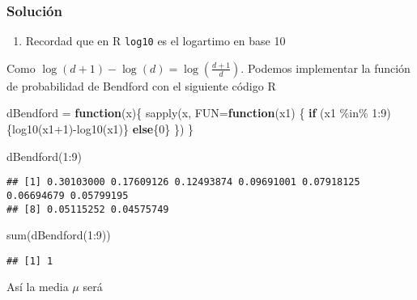 \documentclass[
]{article}
\newenvironment{Shaded}{\begin{snugshade}}{\end{snugshade}}
\newcommand{\AttributeTok}[1]{\textcolor[rgb]{0.77,0.63,0.00}{#1}}
\newcommand{\ControlFlowTok}[1]{\textcolor[rgb]{0.13,0.29,0.53}{\textbf{#1}}}
\newcommand{\DecValTok}[1]{\textcolor[rgb]{0.00,0.00,0.81}{#1}}
\newcommand{\FunctionTok}[1]{\textcolor[rgb]{0.00,0.00,0.00}{#1}}
\newcommand{\NormalTok}[1]{#1}
\newcommand{\OtherTok}[1]{\textcolor[rgb]{0.56,0.35,0.01}{#1}}
\newcommand{\SpecialCharTok}[1]{\textcolor[rgb]{0.00,0.00,0.00}{#1}}
\providecommand{\tightlist}{%
  \setlength{\itemsep}{0pt}\setlength{\parskip}{0pt}}
\begin{document}
\hypertarget{soluciuxf3n}{%
\subsubsection{Solución}\label{soluciuxf3n}}

\begin{enumerate}
\def\labelenumi{\alph{enumi})}
\tightlist
\item
  Recordad que en R \texttt{log10} es el logartimo en base 10
\end{enumerate}

Como \(\log(d+1)-\log(d)=\log(\frac{d+1}{d})\). Podemos implementar la
función de probabilidad de Bendford con el siguiente código R

\begin{Shaded}
\begin{Highlighting}[]
\NormalTok{dBendford }\OtherTok{=} \ControlFlowTok{function}\NormalTok{(x)\{}
  \FunctionTok{sapply}\NormalTok{(x, }\AttributeTok{FUN=}\ControlFlowTok{function}\NormalTok{(x1)}
\NormalTok{  \{}
    \ControlFlowTok{if}\NormalTok{ (x1 }\SpecialCharTok{\%in\%} \DecValTok{1}\SpecialCharTok{:}\DecValTok{9}\NormalTok{)}
\NormalTok{    \{}\FunctionTok{log10}\NormalTok{(x1}\SpecialCharTok{+}\DecValTok{1}\NormalTok{)}\SpecialCharTok{{-}}\FunctionTok{log10}\NormalTok{(x1)\}}
    \ControlFlowTok{else}\NormalTok{\{}\DecValTok{0}\NormalTok{\}}
\NormalTok{  \})}
\NormalTok{\}}

\FunctionTok{dBendford}\NormalTok{(}\DecValTok{1}\SpecialCharTok{:}\DecValTok{9}\NormalTok{)}
\end{Highlighting}
\end{Shaded}

\begin{verbatim}
## [1] 0.30103000 0.17609126 0.12493874 0.09691001 0.07918125 0.06694679 0.05799195
## [8] 0.05115252 0.04575749
\end{verbatim}

\begin{Shaded}
\begin{Highlighting}[]
\FunctionTok{sum}\NormalTok{(}\FunctionTok{dBendford}\NormalTok{(}\DecValTok{1}\SpecialCharTok{:}\DecValTok{9}\NormalTok{))}
\end{Highlighting}
\end{Shaded}

\begin{verbatim}
## [1] 1
\end{verbatim}

Así la media \(\mu\) será
\end{document}
